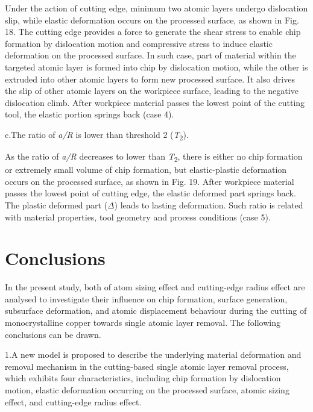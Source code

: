 \documentclass{article}
\begin{document}
Under the action of cutting edge, minimum two atomic layers undergo dislocation slip, while elastic deformation occurs on the processed surface, as shown in Fig. 18. The cutting edge provides a force to generate the shear stress to enable chip formation by dislocation motion and compressive stress to induce elastic deformation on the processed surface. In such case, part of material within the targeted atomic layer is formed into chip by dislocation motion, while the other is extruded into other atomic layers to form new processed surface. It also drives the slip of other atomic layers on the workpiece surface, leading to the negative dislocation climb. After workpiece material passes the lowest point of the cutting tool, the elastic portion springs back (case 4).

\begin{hangpars}
c.\quad The ratio of \emph{a/R} is lower than threshold 2 (\emph{T}\textsubscript{2}).
\end{hangpars}

As the ratio of \emph{a/R} decreases to lower than \emph{T}\textsubscript{2}, there is either no chip formation or extremely small volume of chip formation, but elastic-plastic deformation occurs on the processed surface, as shown in Fig. 19. After workpiece material passes the lowest point of cutting edge, the elastic deformed part springs back. The plastic deformed part (\emph{Δ}) leads to lasting deformation. Such ratio is related with material properties, tool geometry and process conditions (case 5).

\section*{Conclusions}

In the present study, both of atom sizing effect and cutting-edge radius effect are analysed to investigate their influence on chip formation, surface generation, subsurface deformation, and atomic displacement behaviour during the cutting of monocrystalline copper towards single atomic layer removal. The following conclusions can be drawn.

\begin{hangpars}
1.\quad A new model is proposed to describe the underlying material deformation and removal mechanism in the cutting-based single atomic layer removal process, which exhibits four characteristics, including chip formation by dislocation motion, elastic deformation occurring on the processed surface, atomic sizing effect, and cutting-edge radius effect.
\end{hangpars}
\end{document}
